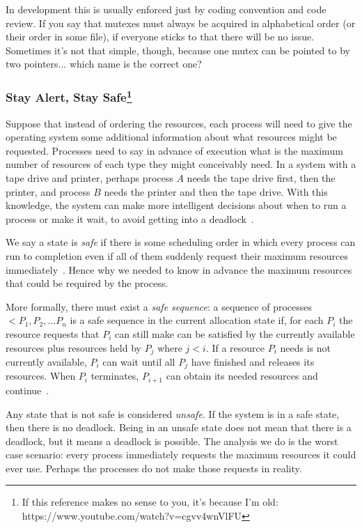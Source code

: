 In development this is usually enforced just by coding convention and code review. If you say that mutexes must always be acquired in alphabetical order (or their order in some file), if everyone sticks to that there will be no issue. Sometimes it's not that simple, though, because one mutex can be pointed to by two pointers... which name is the correct one?

\subsubsection*{Stay Alert, Stay Safe\footnote{If this reference makes no sense to you, it's because I'm old: https://www.youtube.com/watch?v=cgvv4wnVlFU}}

Suppose that instead of ordering the resources, each process will need to give the operating system some additional information about what resources might be requested. Processes need to say in advance of execution what is the maximum number of resources of each type they might conceivably need. In a system with a tape drive and printer, perhaps process $A$ needs the tape drive first, then the printer, and process $B$ needs the printer and then the tape drive. With this knowledge, the system can make more intelligent decisions about when to run a process or make it wait, to avoid getting into a deadlock~\cite{osc}.

We say a state is \textit{safe} if there is some scheduling order in which every process can run to completion even if all of them suddenly request their maximum resources immediately~\cite{mos}. Hence why we needed to know in advance the maximum resources that could be required by the process. 

More formally, there must exist a \textit{safe sequence}: a sequence of processes $<P_{1}, P_{2}, ... P_{n}$ is a safe sequence in the current allocation state if, for each $P_{i}$ the resource requests that $P_{i}$ can still make can be satisfied by the currently available resources plus resources held by $P_{j}$ where $j < i$. If a resource $P_{i}$ needs is not currently available, $P_{i}$ can wait until all $P_{j}$ have finished and releases its resources. When $P_{i}$ terminates, $P_{i+1}$ can obtain its needed resources and continue~\cite{osc}.

Any state that is not safe is considered \textit{unsafe}. If the system is in a safe state, then there is no deadlock. Being in an unsafe state does not mean that there is a deadlock, but it means a deadlock is possible. The analysis we do is the worst case scenario: every process immediately requests the maximum resources it could ever use. Perhaps the processes do not make those requests in reality.

